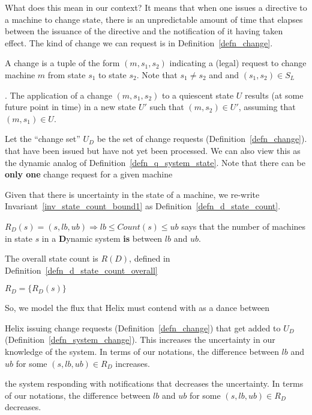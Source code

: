 What does this mean in our context? It means that when one issues a
directive to a machine to change state, there is an unpredictable amount
of time that elapses between the issuance of the directive and the
notification of it having taken effect. The kind of change we can
request is in Definition~\ref{defn_change}.

\begin{definition}
\label{defn_change}
A change is a tuple of the form \((m, s_1, s_2)\) indicating a (legal) request to
change machine \(m\) from state \(s_1\) to state \(s_2\). Note that
\(s_1 \neq s_2\) and and \((s_1, s_2) \in S_L\)
\end{definition}

\begin{definition}
\label{defn_apply_change}.
The application of a change \((m, s_1, s_2)\) to a quiescent state \(U\) 
results (at some future point in time) in a new state \(U'\) such that 
\((m, s_2) \in U'\), assuming that \( (m, s_1) \in U\).
\end{definition}

\begin{definition}
\label{defn_system_change}
Let the ``change set'' \(U_D\) be the set of change requests (Definition~\ref{defn_change}). 
that have been issued but have not yet been processed. We can also view
this as the dynamic analog of Definition~\ref{defn_q_system_state}. Note
that there can be {\bf only one} change request for a given machine 
\end{definition}

Given that there is uncertainty in the state of a machine, we
re-write Invariant~\ref{inv_state_count_bound1} as 
Definition~\ref{defn_d_state_count}.

\begin{definition}
\label{defn_d_state_count}
\(R_D(s) = (s, lb, ub) \Rightarrow lb \leq Count(s) \leq ub
\) says that the number of machines in state \(s\) in a {\bf D}ynamic
system {\bf is} between \(lb\) and \(ub\).
\end{definition}

The overall state count is \(R(D)\), defined in
Definition~\ref{defn_d_state_count_overall}
\begin{definition}
\label{defn_d_state_count_overall}
\(R_D = \{R_D(s)\}\)
\end{definition}

So, we model the flux that Helix must contend with as a dance between 
\bi
\item Helix issuing change requests (Definition~\ref{defn_change}) that get
added to \(U_D\) (Definition~\ref{defn_system_change}). This 
increases the uncertainty in our knowledge of the system. 
In terms of our notations, the
difference between \(lb\) and \(ub\) for some \((s, lb, ub) \in R_D\)
increases.
\item the system responding with notifications that decreases the
uncertainty.
In terms of our notations, the
difference between \(lb\) and \(ub\) for some \((s, lb, ub) \in R_D\)
decreases.
\ei


